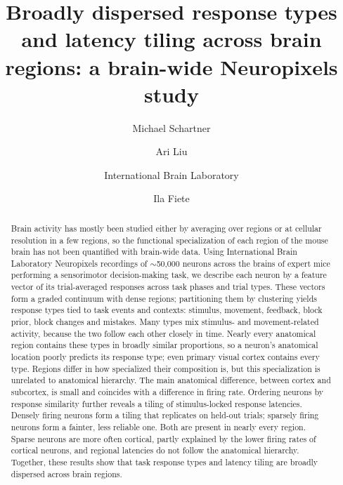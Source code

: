\documentclass[10pt,lineno]{elife}
\title{Broadly dispersed response types and latency tiling across brain regions: a brain-wide Neuropixels study}
\author[1,2,*]{Michael Schartner}
\author[1,3,*]{Ari Liu}
\author[1]{International Brain Laboratory}
\author[1,3]{Ila Fiete}
\affil[1]{The International Brain Laboratory}
\affil[2]{Champalimaud Foundation, Lisbon, Portugal}
\affil[3]{Massachusetts Institute of Technology, Cambridge, MA, USA}
\affil[*]{These authors contributed equally to this work.}
\begin{document}
\maketitle

\begin{abstract}
Brain activity has mostly been studied either by averaging over regions or at cellular resolution in a few regions, so the functional specialization of each region of the mouse brain has not been quantified with brain-wide data. Using International Brain Laboratory Neuropixels recordings of $\sim$50,000 neurons across the brains of expert mice performing a sensorimotor decision-making task, we describe each neuron by a feature vector of its trial-averaged responses across task phases and trial types. These vectors form a graded continuum with dense regions; partitioning them by clustering yields response types tied to task events and contexts: stimulus, movement, feedback, block prior, block changes and mistakes. Many types mix stimulus- and movement-related activity, because the two follow each other closely in time. Nearly every anatomical region contains these types in broadly similar proportions, so a neuron's anatomical location poorly predicts its response type; even primary visual cortex contains every type. Regions differ in how specialized their composition is, but this specialization is unrelated to anatomical hierarchy. The main anatomical difference, between cortex and subcortex, is small and coincides with a difference in firing rate. Ordering neurons by response similarity further reveals a tiling of stimulus-locked response latencies. Densely firing neurons form a tiling that replicates on held-out trials; sparsely firing neurons form a fainter, less reliable one. Both are present in nearly every region. Sparse neurons are more often cortical, partly explained by the lower firing rates of cortical neurons, and regional latencies do not follow the anatomical hierarchy. Together, these results show that task response types and latency tiling are broadly dispersed across brain regions.
\end{abstract}
\end{document}
